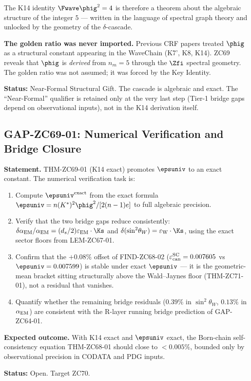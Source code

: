 \documentclass[12pt, a4paper]{article}
\renewcommand{\swsq}{\sin^2\!\theta_W}
\renewcommand{\aEM}{\alpha_{\rm EM}}
\begin{document}
\begin{giftbox}[title={FIND-ZC69-01: Algebraic Cascade ---
  $\delta \to d_s=3 \to n_m=5 \to \Fwave\phig^2=4$ (Gift)}]
The K14 identity $\Fwave\phig^2 = 4$ is therefore a
theorem about the algebraic structure of the integer $5$
— written in the language of spectral graph theory
and unlocked by the geometry of the $\delta$-cascade.

\textbf{The golden ratio was never imported.}
Previous CRF papers treated $\phig$ as a structural
constant appearing in the WaveChain (K7', K8, K14).
ZC69 reveals that $\phig$ is \emph{derived} from $n_m = 5$
through the $\Zfi$ spectral geometry.
The golden ratio was not assumed; it was forced
by the Key Identity.

\textbf{Status:} Near-Formal Structural Gift.
The cascade is algebraic and exact.
The ``Near-Formal'' qualifier is retained only
at the very last step (Tier-1 bridge gaps depend
on observational inputs), not in the K14 derivation itself.
\end{giftbox}

\subsection{GAP-ZC69-01: Numerical Verification and Bridge Closure}
\label{sec:gap01}

\begin{openqbox}[title={GAP-ZC69-01: Numerical Verification of
  Exact $\varepsilon_{\rm univ}$ in Both Tier-1 Bridges (Open)}]

\textbf{Statement.}
THM-ZC69-01 (K14 exact) promotes $\epsuniv$ to an exact constant.
The numerical verification task is:
\begin{enumerate}[leftmargin=2em, noitemsep]
  \item Compute $\epsuniv^{\rm exact}$ from the exact formula
    $\epsuniv = n(K^*)^2\phig^2/[2(n-1)e]$ to full algebraic precision.
  \item Verify that the two bridge gaps reduce consistently:
    $\delta\aEM/\aEM = (d_s/2)\varepsilon_{\rm EM}\cdot\Ks$
    and $\delta(\swsq) = \varepsilon_{\rm W}\cdot\Ks$,
    using the exact sector floors from LEM-ZC67-01.
  \item Confirm that the $+0.08\%$ offset of FIND-ZC68-02
    ($\varepsilon_{\rm can}^{\rm SC} = 0.007605$ vs $\epsuniv = 0.007599$)
    is stable under exact $\epsuniv$ --- it is the geometric-mean
    bracket sitting structurally above the Wald--Jaynes floor
    (THM-ZC71-01), not a residual that vanishes.
  \item Quantify whether the remaining bridge residuals
    ($0.39\%$ in $\swsq$, $0.13\%$ in $\aEM$) are
    consistent with the R-layer running bridge prediction
    of GAP-ZC64-01.
\end{enumerate}

\textbf{Expected outcome.}
With K14 exact and $\epsuniv$ exact, the Born-chain
self-consistency equation THM-ZC68-01 should close
to $<0.005\%$, bounded only by observational precision
in CODATA and PDG inputs.

\textbf{Status:} Open. Target ZC70.
\end{openqbox}
\end{document}
